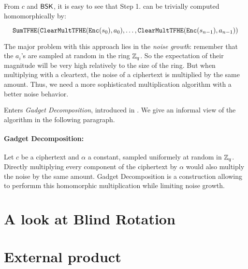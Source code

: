 From $c$ and $\textsf{BSK}$, it is easy to see that Step 1. can be trivially computed homomorphically by:

\begin{equation*}
	\texttt{SumTFHE}(\texttt{ClearMultTFHE}(\texttt{Enc}(s_0), a_0), \dots, \texttt{ClearMultTFHE}(\texttt{Enc}(s_{n-1}), a_{n-1}))
\end{equation*}


The major problem with this approach lies in the \textit{noise growth}: remember that the $a_i$'s are sampled at random in the ring $\mathbb{Z}_q$. So the expectation of their magnitude will be very high relatively to the size of the ring. But when multiplying with a cleartext, the noise of a ciphertext is multiplied by the same amount. Thus, we need a more sophisticated multiplication algorithm with a better noise behavior.

Enters \textit{Gadget Decomposition}, introduced in \cite{GSW13}. We give an informal view of the algorithm in the following paragraph.


\paragraph{Gadget Decomposition: }


Let $c$ be a \LWE ciphertext and $\alpha$ a constant, sampled uniformely at random in $\mathbb{Z}_q$. Directly multiplying every component of the ciphertext by $\alpha$ would also multiply the noise by the same amount. Gadget Decomposition is a construction allowing to performm this homomorphic multiplication while limiting noise growth.





\section{A look at Blind Rotation}




\section{External product}


